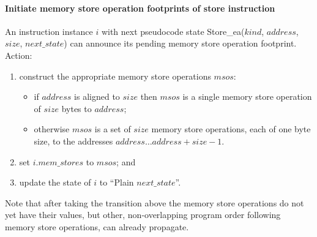 %

\paragraph{Initiate memory store operation footprints of store instruction}\label{omm:thread:announce_mem_write_footprint}
An instruction instance $i$ with next pseudocode state {\sc Store\_ea}($kind$, $address$, $size$, $next\_state$) can announce its pending memory store operation footprint.
Action:
\begin{enumerate}
\item construct the appropriate memory store operations $msos$:
  \begin{itemize}
  \item if $address$ is aligned to $size$ then $msos$ is a single memory store operation of $size$ bytes to $address$;
  \item otherwise $msos$ is a set of $size$ memory store operations, each of one byte size, to the addresses $address\ldots address+size-1$.
  \end{itemize}
\item set $i.mem\_stores$ to $msos$; and
\item update the state of $i$ to ``{\sc Plain} $next\_state$''.
\end{enumerate}

\begin{commentary}
Note that after taking the transition above the memory store operations do not yet have their values, but other, non-overlapping program order following memory store operations, can already propagate.
\end{commentary}


